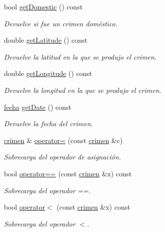 \begin{DoxyCompactItemize}
bool \hyperlink{classcrimen_a1849e7a82111773a6919318b9cf1d05d}{get\-Domestic} () const 
\begin{DoxyCompactList}\small\item\em Devuelve si fue un crimen doméstico. \end{DoxyCompactList}\item 
double \hyperlink{classcrimen_adfd62cd48c7d1d0259c007d3f6c39d58}{get\-Latitude} () const 
\begin{DoxyCompactList}\small\item\em Devuelve la latitud en la que se produjo el crimen. \end{DoxyCompactList}\item 
double \hyperlink{classcrimen_a0c24726cd34dc975b3fc7c664287a15c}{get\-Longitude} () const 
\begin{DoxyCompactList}\small\item\em Devuelve la longitud en la que se produjo el crimen. \end{DoxyCompactList}\item 
\hyperlink{classfecha}{fecha} \hyperlink{classcrimen_a8a6712e536211034819441ab87e1c215}{get\-Date} () const 
\begin{DoxyCompactList}\small\item\em Devuelve la fecha del crimen. \end{DoxyCompactList}\item 
\hyperlink{classcrimen}{crimen} \& \hyperlink{classcrimen_a675f3a6e34bf43e20613a96b93cbb407}{operator=} (const \hyperlink{classcrimen}{crimen} \&c)
\begin{DoxyCompactList}\small\item\em Sobrecarga del operador de asignación. \end{DoxyCompactList}\item 
bool \hyperlink{classcrimen_aeced9ce4b7486123412975b8884d1ab7}{operator==} (const \hyperlink{classcrimen}{crimen} \&x) const 
\begin{DoxyCompactList}\small\item\em Sobrecarga del operador ==. \end{DoxyCompactList}\item 
bool \hyperlink{classcrimen_ac865fdb9712f2426d947b1b5546b50e5}{operator$<$} (const \hyperlink{classcrimen}{crimen} \&x) const 
\begin{DoxyCompactList}\small\item\em Sobrecarga del operador $<$. \end{DoxyCompactList}\end{DoxyCompactItemize}
